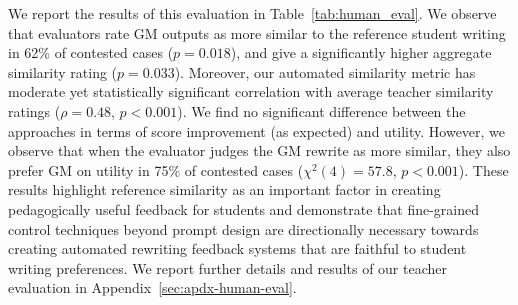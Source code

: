 \documentclass[11pt]{article}
\newcommand{\ml}[1]{\textcolor{orange}{\bf [lan: #1]}}
\begin{document}
We report the results of this evaluation in Table~\ref{tab:human_eval}. We observe that evaluators rate GM outputs as more similar to the reference student writing in 62\% of contested cases ($p=0.018$), and give a significantly higher aggregate similarity rating ($p=0.033$). Moreover, our automated similarity metric has moderate yet statistically significant correlation with average teacher similarity ratings ($\rho=0.48$, $p<0.001$). We find no significant difference between the approaches in terms of score improvement (as expected) and utility. However, we observe that when the evaluator judges the GM rewrite as more similar, they also prefer GM on utility in 75\% of contested cases ($\chi^2(4)=57.8$, $p<0.001$). 
These results highlight reference similarity as an important factor in creating pedagogically useful feedback for students and demonstrate that fine-grained control techniques beyond prompt design are directionally necessary towards creating automated rewriting feedback systems that are faithful to student writing preferences. We report further details and results of our teacher evaluation in Appendix~\ref{sec:apdx-human-eval}.

\end{document}
